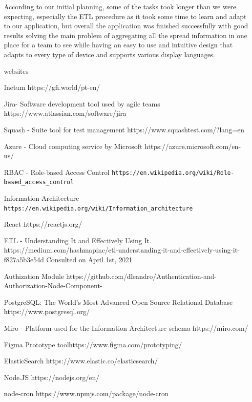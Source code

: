 \documentclass[a4paper,twoside,10pt]{report}
\begin{document}
According to our initial planning, some of the tasks took longer than we were expecting, especially the ETL procedure as it took some time to learn and adapt to our application, but overall the application was finished successfully with good results solving the main problem of aggregating all the spread information in one place for a team to see while having an easy to use and intuitive design that adapts to every type of device and supports various display languages.





\begin{thebibliography} {websites}

 Inetum https://gfi.world/pt-en/

 Jira- Software development tool used by agile teams
https://www.atlassian.com/software/jira

 Squash - Suite tool for test management
https://www.squashtest.com/?lang=en

 Azure - Cloud computing service by Microsoft
https://azure.microsoft.com/en-us/

 RBAC - Role-based Access Control
\texttt{https://en.wikipedia.org/wiki/Role-based\_access\_control}

 Information Architecture
\texttt{https://en.wikipedia.org/wiki/Information\_architecture}

 React https://reactjs.org/

 ETL - Understanding It and Effectively Using It.
https://medium.com/hashmapinc/etl-understanding-it-and-effectively-using-it-f827a5b3e54d
Consulted on April 1st, 2021

 Authization Module
https://github.com/dleandro/Authentication-and-Authorization-Node-Component-

 PostgreSQL: The World's Most Advanced Open Source Relational Database
https://www.postgresql.org/

 Miro - Platform used for the Information Architecture schema
https://miro.com/

 Figma Prototype toolhttps://www.figma.com/prototyping/

 ElasticSearch https://www.elastic.co/elasticsearch/

 Node.JS https://nodejs.org/en/

 node-cron https://www.npmjs.com/package/node-cron


\end{thebibliography}
\end{document}

